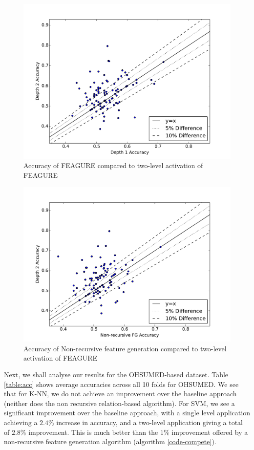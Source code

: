 \documentclass[twoside,11pt]{article}
\theoremstyle{definition}
\begin{document}
\begin{figure}
\centering
\includegraphics[width=0.7\linewidth]{knn_08_lvl1_vs_lvl2}
\caption{Accuracy of FEAGURE compared to two-level activation of FEAGURE}
\label{fig:knn_08_lvl1_vs_lvl2}
\end{figure}

\begin{figure}
\centering
\includegraphics[width=0.7\linewidth]{knn_08_compete_vs_lvl2}
\caption{Accuracy of Non-recursive feature generation compared to two-level activation of FEAGURE}
\label{fig:knn_08_compete_vs_lvl2}
\end{figure}


Next, we shall analyse our results for the OHSUMED-based dataset.
Table \ref{table:acc} shows average accuracies across all 10 folds for OHSUMED. We see that for K-NN, we do not achieve an improvement over the baseline approach (neither does the non recursive relation-based algorithm). For SVM, we see a significant improvement over the baseline approach, with a single level application achieving a $2.4\%$ increase in accuracy, and a two-level application giving a total of $2.8\%$ improvement. This is much better than the $1\%$ improvement offered by a non-recursive feature generation algorithm (algorithm \ref{code-compete}).
\end{document}
